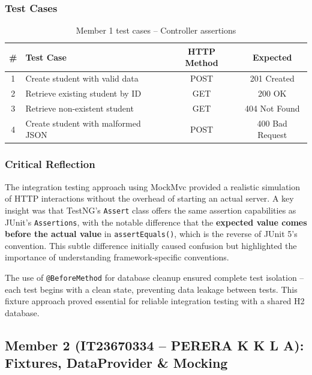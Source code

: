 \documentclass[12pt,a4paper]{article}
\begin{document}
\subsubsection{Test Cases}

\begin{table}[H]
\centering
\begin{tabular}{clcc}
    \toprule
    \textbf{\#} & \textbf{Test Case} & \textbf{HTTP Method} & \textbf{Expected} \\
    \midrule
    1 & Create student with valid data & POST & 201 Created \\
    2 & Retrieve existing student by ID & GET & 200 OK \\
    3 & Retrieve non-existent student & GET & 404 Not Found \\
    4 & Create student with malformed JSON & POST & 400 Bad Request \\
    \bottomrule
\end{tabular}
\caption{Member 1 test cases -- Controller assertions}
\end{table}

\subsubsection{Critical Reflection}

The integration testing approach using MockMvc provided a realistic simulation of HTTP interactions without the overhead of starting an actual server. A key insight was that TestNG's \texttt{Assert} class offers the same assertion capabilities as JUnit's \texttt{Assertions}, with the notable difference that the \textbf{expected value comes before the actual value} in \texttt{assertEquals()}, which is the reverse of JUnit 5's convention. This subtle difference initially caused confusion but highlighted the importance of understanding framework-specific conventions.

The use of \texttt{@BeforeMethod} for database cleanup ensured complete test isolation -- each test begins with a clean state, preventing data leakage between tests. This fixture approach proved essential for reliable integration testing with a shared H2 database.

\subsection{Member 2 (IT23670334 -- PERERA K K L A): Fixtures, DataProvider \& Mocking}
\end{document}
